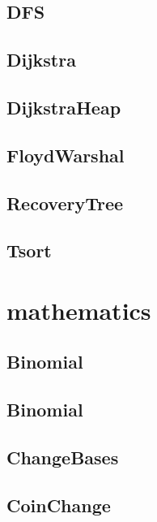 \subsection{ DFS}
\raggedbottom
\hrulefill
\subsection{ Dijkstra}
\raggedbottom
\hrulefill
\subsection{ DijkstraHeap}
\raggedbottom
\hrulefill
\subsection{ FloydWarshal}
\raggedbottom
\hrulefill
\subsection{ RecoveryTree}
\raggedbottom
\hrulefill
\subsection{ Tsort}
\raggedbottom
\hrulefill

\section{mathematics}
\subsection{ Binomial}
\raggedbottom
\hrulefill
\subsection{ Binomial}
\raggedbottom
\hrulefill
\subsection{ ChangeBases}
\raggedbottom
\hrulefill
\subsection{ CoinChange}
\raggedbottom
\hrulefill
